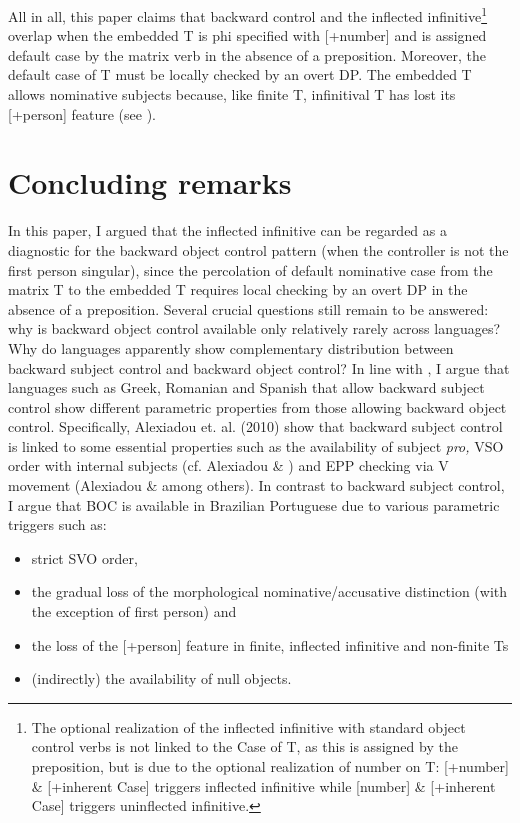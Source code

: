\documentclass[output=paper]{langsci/langscibook}
\begin{document}
All in all, this paper claims that backward control and the inflected infinitive\footnote{The optional realization of the inflected infinitive with standard object control verbs is not linked to the Case of T, as this is assigned by the preposition, but is due to the optional realization of number on T: [+number] \& [+inherent Case]  triggers inflected infinitive while [\textminus number] \& [+inherent Case] triggers uninflected infinitive.} overlap when the embedded T is phi specified with [+number] and is assigned default case by the matrix verb in the absence of a preposition. Moreover, the default case of T must be locally checked by an overt DP. The embedded T allows nominative subjects because, like finite T, infinitival T has lost its [+person] feature (see \citealt{Cyrino2010}).

\section{Concluding remarks}%

In this paper, I argued that the inflected infinitive can be regarded as a diagnostic for the backward object control pattern (when the controller is not the first person singular), since the percolation of default nominative case from the matrix T to the embedded T requires local checking by an overt DP in the absence of a preposition. Several crucial questions still remain to be answered: why is backward object control available only relatively rarely across languages? Why do languages apparently show complementary distribution between backward subject control and backward object control? In line with \citet{AlexiadouEtAl2010}, I argue that languages such as Greek, Romanian and Spanish that allow backward subject control show different parametric properties from those allowing backward object control. Specifically, Alexiadou et. al. (2010) show that backward subject control is linked to some essential properties such as the availability of subject \textit{pro,} VSO order with internal subjects (cf. Alexiadou \& \citealt{Anagnostopoulou2001}) and EPP checking via V movement (Alexiadou \& \citealt{Anagnostopoulou1998} among others). In contrast to backward subject control, I argue that BOC is available in Brazilian Portuguese due to various parametric triggers such as:

\begin{itemize}
\item strict SVO order, 
\item the gradual loss of the morphological nominative/accusative distinction (with the exception of first person) and 
\item the loss of the [+person] feature in finite, inflected infinitive and non-finite Ts
\item (indirectly) the availability of null objects. 
\end{itemize}
\end{document}
